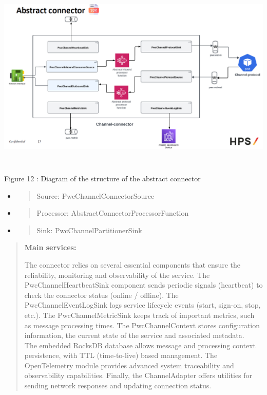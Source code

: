 \documentclass[12pt,a4paper]{report}
\begin{document}
\includegraphics[width=6.31605in,height=3.54559in]{vertopal_d1b0b2209edd4c6aa8254f57daa0953b/media/image31.png}

\protect\hypertarget{_Toc201954488}{}{}Figure 12 : Diagram of the
structure of the abstract connector

\begin{itemize}
\item
  \begin{quote}
  Source: PwcChannelConnectorSource
  \end{quote}
\item
  \begin{quote}
  Processor: AbstractConnectorProcessorFunction
  \end{quote}
\item
  \begin{quote}
  Sink: PwcChannelPartitionerSink
  \end{quote}
\end{itemize}

\begin{quote}
\textbf{Main services:}

The connector relies on several essential components that ensure the
reliability, monitoring and observability of the service. The
PwcChannelHeartbeatSink component sends periodic signals (heartbeat) to
check the connector status (online / offline). The
PwcChannelEventLogSink logs service lifecycle events (start, sign-on,
stop, etc.). The PwcChannelMetricSink keeps track of important metrics,
such as message processing times. The PwcChannelContext stores
configuration information, the current state of the service and
associated metadata.\\
The embedded RocksDB database allows message and processing context
persistence, with TTL (time-to-live) based management. The OpenTelemetry
module provides advanced system traceability and observability
capabilities. Finally, the ChannelAdapter offers utilities for sending
network responses and updating connection status.
\end{quote}
\end{document}
